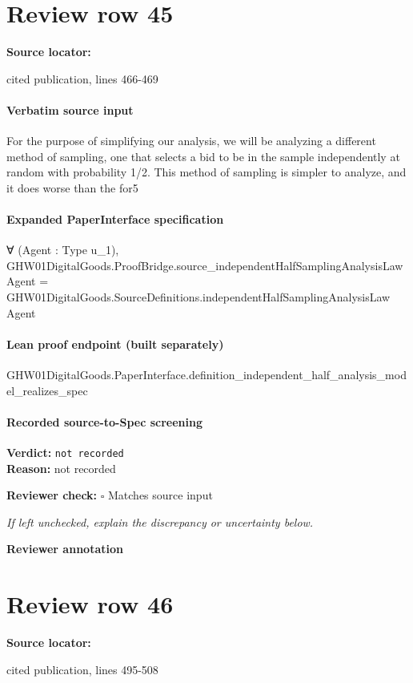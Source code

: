 \documentclass[10pt]{article}
\newcommand{\reviewerbox}{%
  \par\noindent\fbox{\parbox{0.96\linewidth}{\rule{0pt}{0.38in}}}\par
}
\newcommand{\reviewmatch}[1]{%
  \par\noindent\textbf{Reviewer check:} $\square$\; #1\par
  \noindent\emph{If left unchecked, explain the discrepancy or uncertainty below.}\par
}
\begin{document}
\section*{Review row 45}
\textbf{Source locator:} {\footnotesize\raggedright cited publication, lines 466-\allowbreak{}469\par}
\paragraph{Verbatim source input}
\begin{ReviewVerbatim}
For the purpose of simplifying our analysis, we will
be analyzing a different method of sampling, one that
selects a bid to be in the sample independently at random with probability 1/2. This method of sampling
is simpler to analyze, and it does worse than the for5
\end{ReviewVerbatim}


\paragraph{Expanded PaperInterface specification}
\begin{ReviewVerbatim}
∀ (Agent : Type u_1),
  GHW01DigitalGoods.ProofBridge.source_independentHalfSamplingAnalysisLaw Agent =
    GHW01DigitalGoods.SourceDefinitions.independentHalfSamplingAnalysisLaw Agent
\end{ReviewVerbatim}

\paragraph{Lean proof endpoint (built separately)}\begin{ReviewVerbatim}
GHW01DigitalGoods.PaperInterface.definition_independent_half_analysis_model_realizes_spec
\end{ReviewVerbatim}

\paragraph{Recorded source-to-Spec screening}
\textbf{Verdict:} \texttt{not recorded}
\\
\textbf{Reason:} not recorded
\reviewmatch{Matches source input}
\noindent\textbf{Reviewer annotation}\par
\reviewerbox
\clearpage
\hypertarget{source-claim-e93feb6521b52515}{}
\section*{Review row 46}
\textbf{Source locator:} {\footnotesize\raggedright cited publication, lines 495-\allowbreak{}508\par}
\end{document}
